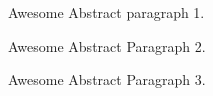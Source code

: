 \begin{large}
\noindent 
\begin{flushleft}
Awesome Abstract paragraph 1.
\end{flushleft}


\begin{flushleft}
Awesome Abstract Paragraph 2.
\end{flushleft}

\begin{flushleft}
Awesome Abstract Paragraph 3.
\end{flushleft}
\end{large}